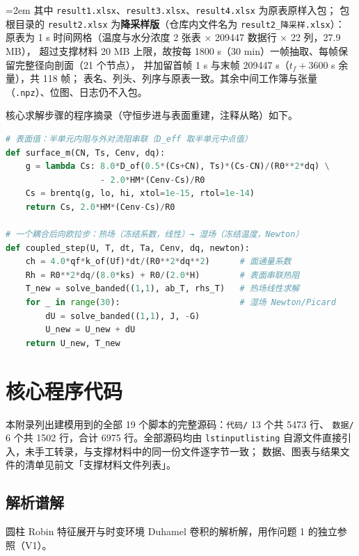 \documentclass[12pt,a4paper]{ctexart}
\numberwithin{equation}{section}
\begin{document}
{\emergencystretch=2em
其中 \texttt{result1.xlsx}、\texttt{result3.xlsx}、\texttt{result4.xlsx} 为原表原样入包；
包根目录的 \texttt{result2.xlsx} 为\textbf{降采样版}（仓库内文件名为 \texttt{result2\_降采样.xlsx}）：
原表为 1 s 时间网格（温度与水分浓度 2 张表 × 209447 数据行 × 22 列，27.9 MB），
超过支撑材料 20 MB 上限，故按每 1800 s（30 min）一帧抽取、每帧保留完整径向剖面（21 个节点），
并加留首帧 1 s 与末帧 209447 s（$t_f+3600$ s 余量），共 118 帧；
表名、列头、列序与原表一致。其余中间工作簿与张量（\texttt{.npz}）、位图、日志仍不入包。}

核心求解步骤的程序摘录（守恒步进与表面重建，注释从略）如下。

\begin{lstlisting}[language=Python,caption={守恒耦合步进核心（solver 摘录）}]
# 表面值：半单元内阻与外对流阻串联（D_eff 取半单元中点值）
def surface_m(CN, Ts, Cenv, dq):
    g = lambda Cs: 8.0*D_of(0.5*(Cs+CN), Ts)*(Cs-CN)/(R0**2*dq) \
                   - 2.0*HM*(Cenv-Cs)/R0
    Cs = brentq(g, lo, hi, xtol=1e-15, rtol=1e-14)
    return Cs, 2.0*HM*(Cenv-Cs)/R0

# 一个耦合后向欧拉步：热场（冻结系数，线性）→ 湿场（冻结温度，Newton）
def coupled_step(U, T, dt, Ta, Cenv, dq, newton):
    ch = 4.0*qf*k_of(Uf)*dt/(R0**2*dq**2)      # 面通量系数
    Rh = R0**2*dq/(8.0*ks) + R0/(2.0*H)        # 表面串联热阻
    T_new = solve_banded((1,1), ab_T, rhs_T)   # 热场线性求解
    for _ in range(30):                        # 湿场 Newton/Picard
        dU = solve_banded((1,1), J, -G)
        U_new = U_new + dU
    return U_new, T_new
\end{lstlisting}

\section{核心程序代码}
本附录列出建模用到的全部 19 个脚本的完整源码：\texttt{代码/} 13 个共 5473 行、
\texttt{数据/} 6 个共 1502 行，合计 6975 行。全部源码均由 \texttt{lstinputlisting}
自源文件直接引入，未手工转录，与支撑材料中的同一份文件逐字节一致；
数据、图表与结果文件的清单见前文「支撑材料文件列表」。

\subsection{解析谱解}
圆柱 Robin 特征展开与时变环境 Duhamel 卷积的解析解，用作问题 1 的独立参照（V1）。

\end{document}
